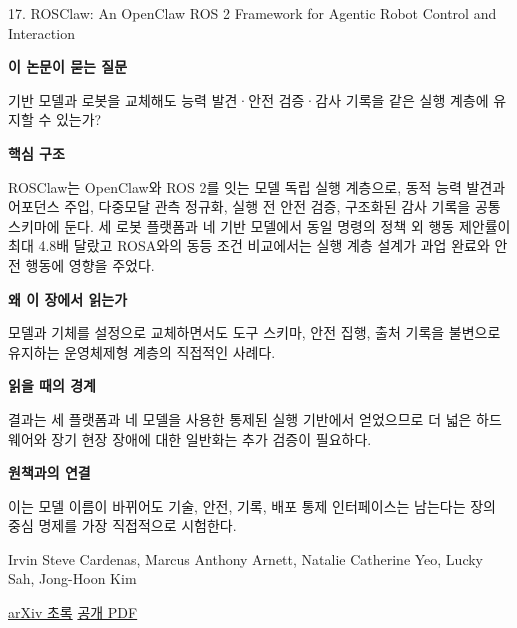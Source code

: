 \documentclass[11pt,openany]{book}
\begin{document}
\begin{termcard}{17. ROSClaw: An OpenClaw ROS 2 Framework for Agentic Robot Control and Interaction}

\par

\medskip

{\sffamily\bfseries\color{deepblue} 이 논문이 묻는 질문}\par

기반 모델과 로봇을 교체해도 능력 발견·안전 검증·감사 기록을 같은 실행 계층에 유지할 수 있는가?

\smallskip

{\sffamily\bfseries\color{deepblue} 핵심 구조}\par

ROSClaw는 OpenClaw와 ROS 2를 잇는 모델 독립 실행 계층으로, 동적 능력 발견과 어포던스 주입, 다중모달 관측 정규화, 실행 전 안전 검증, 구조화된 감사 기록을 공통 스키마에 둔다. 세 로봇 플랫폼과 네 기반 모델에서 동일 명령의 정책 외 행동 제안률이 최대 4.8배 달랐고 ROSA와의 동등 조건 비교에서는 실행 계층 설계가 과업 완료와 안전 행동에 영향을 주었다.

\smallskip

{\sffamily\bfseries\color{deepblue} 왜 이 장에서 읽는가}\par

모델과 기체를 설정으로 교체하면서도 도구 스키마, 안전 집행, 출처 기록을 불변으로 유지하는 운영체제형 계층의 직접적인 사례다.

\smallskip

{\sffamily\bfseries\color{coral} 읽을 때의 경계}\par

결과는 세 플랫폼과 네 모델을 사용한 통제된 실행 기반에서 얻었으므로 더 넓은 하드웨어와 장기 현장 장애에 대한 일반화는 추가 검증이 필요하다.

\smallskip

{\sffamily\bfseries\color{teal} 원책과의 연결}\par

이는 모델 이름이 바뀌어도 기술, 안전, 기록, 배포 통제 인터페이스는 남는다는 장의 중심 명제를 가장 직접적으로 시험한다.

\medskip

{\footnotesize\color{muted} Irvin Steve Cardenas, Marcus Anthony Arnett, Natalie Catherine Yeo, Lucky Sah, Jong-Hoon Kim\par

\href{https://arxiv.org/abs/2603.26997}{arXiv 초록} \quad \href{https://arxiv.org/pdf/2603.26997}{공개 PDF}\par}

\end{termcard}
\end{document}
